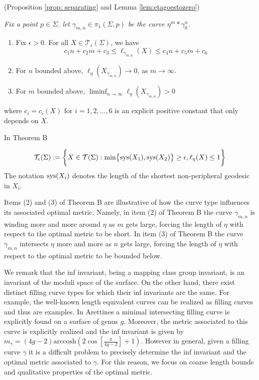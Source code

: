 \documentclass[12pt]{amsart}
\numberwithin{equation}{section}
\theoremstyle{plain}
\begin{document}
\vskip5pt
 (Proposition \ref{prop: separating} and Lemma \ref{lem:etagoestozero}) {\it 
Fix a point $p \in \Sigma$. let $\gamma_{m,n} \in \pi_1 (\Sigma,p)$
be the curve $\eta^{m}\ast  \gamma_{0}^{n}$.
\begin{enumerate}
\item 
  Fix $\epsilon >0$.
For all $X \in  \mathcal{T}_{\epsilon}(\Sigma)$, we have
\begin{equation*}
c_{1}n+c_{2}m + c_{3} 
\leq 
\ell_{\gamma_{m,n}}(X) 
\leq 
c_{4}n + c_{5} m +c_{6}
\end{equation*}
\item
For $n$ bounded above, $\ell_{\eta}(X_{\gamma_{m,n}}) \rightarrow 0$, as $m \rightarrow \infty$.
\item For $m$ bounded above, 
$\liminf_{n \rightarrow \infty} \ell_{\eta}(X_{\gamma_{m,n}})>0$
\end{enumerate}
where  $c_{i}=c_{i}(X)$ for $i=1,2,...,6$ is an explicit  positive constant that only depends on $X$.}

\vskip5pt

In  Theorem B
 
$$\mathcal{T}_{\epsilon} (\Sigma):=
\bigg\{X \in \mathcal{T}(\Sigma): \text{min} \big\{\textup{sys} (X_{1}),
\textup{sys}(X_{2})\big\}\geq \epsilon, 
\ell_{\eta} (X) \leq {1} \bigg\} $$
The notation $\textup{sys}(X_i)$ denotes the length of the shortest non-peripheral geodesic in $X_i$. 

Items (2) and (3) of Theorem B  are illustrative of  how the curve type influences its associated  optimal metric.
Namely, in item (2) of Theorem B the curve $\gamma_{m,n}$ is winding more and more around $\eta$ as $m$ gets large, forcing the length of $\eta$ with respect to the  optimal metric to be short. In item (3) of Theorem B the curve $\gamma_{m,n}$  intersects $\eta$ more and more as $n$ gets large, forcing the  length of $\eta$ with respect to the optimal metric 
to be bounded below.


  
We remark that the inf invariant, being a mapping class group invariant, is an invariant of the moduli space of the surface. On the other hand, there exist  distinct filling curve types for which their inf  invariants are the same.  For example, the well-known length equivalent curves \cite{leininger2003equivalent} can be realized as filling curves and thus are examples. In Arettines \cite{arettines2015geometry} a minimal intersecting filling curve is  explicitly found on a surface of genus $g$. Moreover,  the metric associated to this curve is explicitly realized  and the $\text{inf}$ invariant is given by $m_{\gamma}= (4g - 2)\text{arccosh}(2 \cos [\frac{\pi}{4g-2}] + 1)$. However in general,
given  a filling curve  $\gamma$  it is a difficult problem  to precisely determine  the 
$\text{inf}$   invariant  and the optimal metric  associated to $\gamma$. For this reason, we focus on coarse length bounds and qualitative properties of the optimal metric. 
\end{document}
